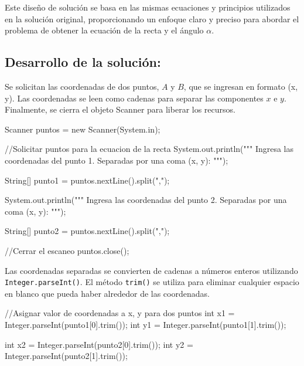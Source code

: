 Este diseño de solución se basa en las mismas ecuaciones y principios utilizados en la solución original, proporcionando un enfoque claro y preciso para abordar el problema de obtener la ecuación de la recta y el ángulo \(\alpha\).

\subsection{\textbf{Desarrollo de la solución:}}

Se solicitan las coordenadas de dos puntos, \(A\) y \(B\), que se ingresan en formato (x, y). Las coordenadas se leen como cadenas para separar las componentes \(x\) e \(y\). Finalmente, se cierra el objeto Scanner para liberar los recursos.

    \begin{javaCode}
        Scanner puntos = new Scanner(System.in);
        
        //Solicitar puntos para la ecuacion de la recta
        System.out.println("""
                            Ingresa las coordenadas del punto 1.
                            Separadas por una coma (x, y):
                            """);

    \end{javaCode}
    \begin{javaCode}
        String[] punto1 = puntos.nextLine().split(",");
        
        System.out.println("""
                            Ingresa las coordenadas del punto 2.
                            Separadas por una coma (x, y):
                            """);
        
        String[] punto2 = puntos.nextLine().split(",");
        
        //Cerrar el escaneo
        puntos.close();
    \end{javaCode}

Las coordenadas separadas se convierten de cadenas a números enteros utilizando \texttt{Integer.parseInt()}. El método \texttt{trim()} se utiliza para eliminar cualquier espacio en blanco que pueda haber alrededor de las coordenadas.

    \begin{javaCode}
        //Asignar valor de coordenadas a x, y para dos puntos
        int x1 = Integer.parseInt(punto1[0].trim());
        int y1 = Integer.parseInt(punto1[1].trim());
        
        int x2 = Integer.parseInt(punto2[0].trim());
        int y2 = Integer.parseInt(punto2[1].trim());
    \end{javaCode}

